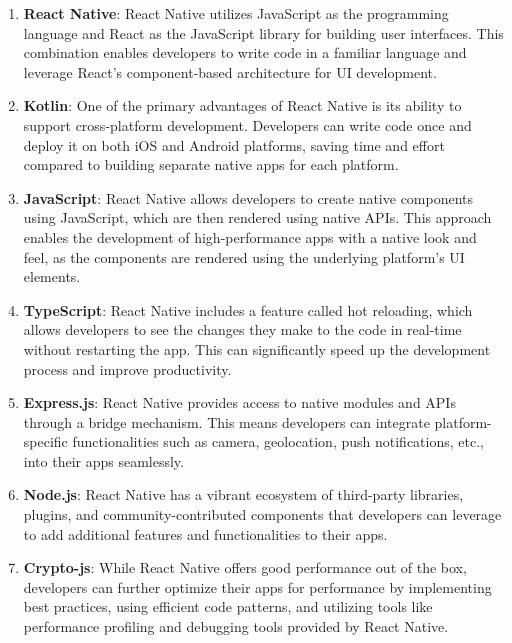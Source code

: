 
\begin{enumerate}
  \item \textbf{React Native}: React Native utilizes JavaScript as the programming language and React as the JavaScript library for building user interfaces. This combination enables developers to write code in a familiar language and leverage React's component-based architecture for UI development.
  
  \item \textbf{Kotlin}: One of the primary advantages of React Native is its ability to support cross-platform development. Developers can write code once and deploy it on both iOS and Android platforms, saving time and effort compared to building separate native apps for each platform.
  
  \item \textbf{JavaScript}: React Native allows developers to create native components using JavaScript, which are then rendered using native APIs. This approach enables the development of high-performance apps with a native look and feel, as the components are rendered using the underlying platform's UI elements.
  
  \item \textbf{TypeScript}: React Native includes a feature called hot reloading, which allows developers to see the changes they make to the code in real-time without restarting the app. This can significantly speed up the development process and improve productivity.
  
  \item \textbf{Express.js}: React Native provides access to native modules and APIs through a bridge mechanism. This means developers can integrate platform-specific functionalities such as camera, geolocation, push notifications, etc., into their apps seamlessly.
  
  \item \textbf{Node.js}: React Native has a vibrant ecosystem of third-party libraries, plugins, and community-contributed components that developers can leverage to add additional features and functionalities to their apps.
  
  \item \textbf{Crypto-js}: While React Native offers good performance out of the box, developers can further optimize their apps for performance by implementing best practices, using efficient code patterns, and utilizing tools like performance profiling and debugging tools provided by React Native.


\end{enumerate}
